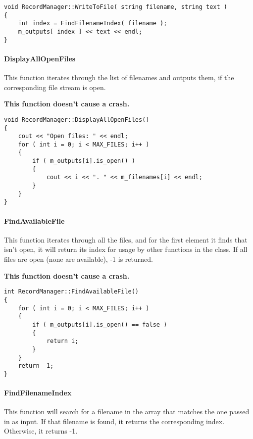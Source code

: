 \documentclass[a4paper,12pt]{book}
\begin{document}
\begin{lstlisting}[style=code]
void RecordManager::WriteToFile( string filename, string text )
{
    int index = FindFilenameIndex( filename );
    m_outputs[ index ] << text << endl;
}
\end{lstlisting}

            \paragraph{DisplayAllOpenFiles}
            This function iterates through the list of filenames
            and outputs them, if the corresponding file stream is open.

            \textbf{This function doesn't cause a crash.}
            
\begin{lstlisting}[style=code]
void RecordManager::DisplayAllOpenFiles()
{
    cout << "Open files: " << endl;
    for ( int i = 0; i < MAX_FILES; i++ )
    {
        if ( m_outputs[i].is_open() )
        {
            cout << i << ". " << m_filenames[i] << endl;
        }
    }
}
\end{lstlisting}

            \newpage
            \paragraph{FindAvailableFile}
            This function iterates through all the files, and for the first
            element it finds that isn't open, it will return its index
            for usage by other functions in the class. If all files
            are open (none are available), -1 is returned.

            \textbf{This function doesn't cause a crash.}
            
\begin{lstlisting}[style=code]
int RecordManager::FindAvailableFile()
{
    for ( int i = 0; i < MAX_FILES; i++ )
    {
        if ( m_outputs[i].is_open() == false )
        {
            return i;
        }
    }
    return -1;
}
\end{lstlisting}

            \paragraph{FindFilenameIndex}
            This function will search for a filename in the array
            that matches the one passed in as input. If that filename
            is found, it returns the corresponding index. Otherwise,
            it returns -1.
\end{document}
